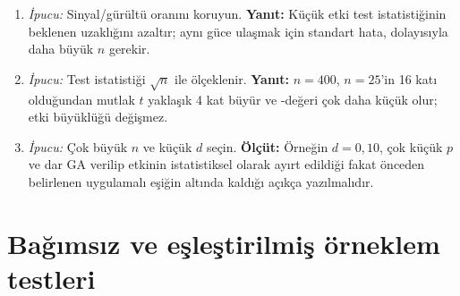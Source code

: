 \begin{enumerate}[leftmargin=*,itemsep=5pt]
\textbf{Yanıt:} Yaklaşık $49{,}07$; yukarı yuvarlayarak en az 50 (kesin
$t$ hesabı biraz daha büyük değer verebilir).
\item \emph{İpucu:} Sinyal/gürültü oranını koruyun.
\textbf{Yanıt:} Küçük etki test istatistiğinin beklenen uzaklığını azaltır;
aynı güce ulaşmak için standart hata, dolayısıyla daha büyük $n$ gerekir.
\item \emph{İpucu:} Test istatistiği $\sqrt n$ ile ölçeklenir.
\textbf{Yanıt:} $n=400$, $n=25$'in 16 katı olduğundan mutlak $t$ yaklaşık
4 kat büyür ve \pval-değeri çok daha küçük olur; etki büyüklüğü değişmez.
\item \emph{İpucu:} Çok büyük $n$ ve küçük $d$ seçin.
\textbf{Ölçüt:} Örneğin $d=0{,}10$, çok küçük $p$ ve dar GA verilip etkinin
istatistiksel olarak ayırt edildiği fakat önceden belirlenen uygulamalı eşiğin
altında kaldığı açıkça yazılmalıdır.
\end{enumerate}

\section{Bağımsız ve eşleştirilmiş örneklem testleri}

